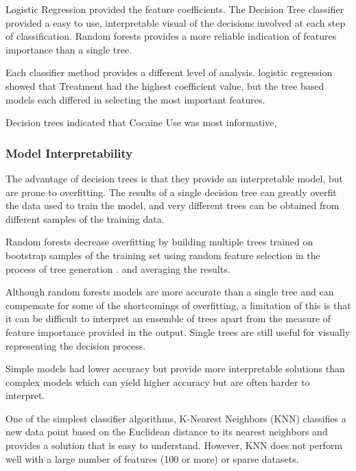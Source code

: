 \documentclass[sigconf]{acmart}
\begin{document}
Logistic Regression provided the feature coefficients. 
The Decision Tree classifier provided a easy to use, interpretable visual of
the decisions involved at each step of classification. Random forests provides
a more reliable indication of features importance than a single tree. 

Each classifier method provides a different level of analysis. 
logistic regression showed that Treatment had the highest coefficient value, but 
the tree based models each differed in selecting the most important features. 

Decision trees indicated that Cocaine Use was most informative,


\subsubsection{Model Interpretability}

The advantage of decision trees is that they provide an interpretable model,
but are prone to overfitting. The results of a single decision tree can greatly overfit the data used
to train the model, and very different trees can be obtained from different
samples of the training data.

Random forests decrease overfitting by building multiple trees trained on
bootstrap samples of the training set using random feature selection in the
process of tree generation \cite{brown12}. 
and averaging the results.

Although random forests models are more accurate than a single tree and can
compensate for some of the shortcomings of overfitting, a limitation of this 
is that it can be difficult to interpret an ensemble of trees apart from the 
measure of feature importance provided in the output. Single trees are still 
useful for visually representing the decision process.

Simple models had lower accuracy but provide more interpretable solutions 
than complex models which can yield higher accuracy but are often harder 
to interpret. 

One of the simplest classifier algorithms, K-Nearest Neighbors (KNN)
classifies a new data point based on the Euclidean distance to its 
nearest neighbors and provides a solution that is easy to understand. 
However, KNN does not perform well with a large number of features 
(100 or more) or sparse datasets.
\end{document}
